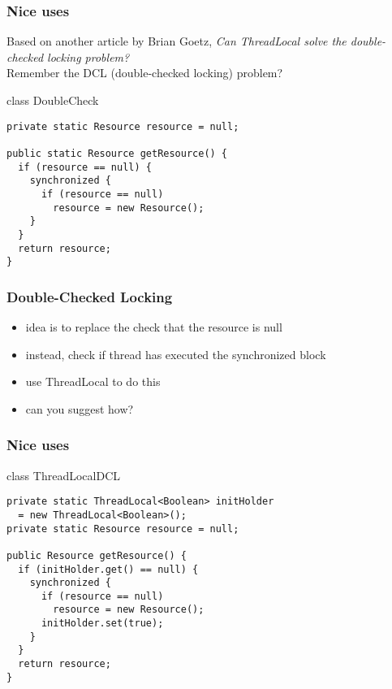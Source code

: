 \documentclass{beamer}
\begin{document}
\begin{frame}[fragile]
  \frametitle{Nice uses}

Based on another article by Brian Goetz, \textit{Can ThreadLocal solve the double-checked locking problem?}\\
\vspace*{0.5cm}
Remember the DCL (double-checked locking) problem?

\begin{block}{class DoubleCheck}
\begin{verbatim}
private static Resource resource = null;

public static Resource getResource() {
  if (resource == null) {
    synchronized {
      if (resource == null) 
        resource = new Resource();
    }
  }
  return resource;
}
\end{verbatim}
\end{block}

\end{frame}

\begin{frame}
  \frametitle{Double-Checked Locking}

\begin{itemize}
\item idea is to replace the check that the resource is null
\item instead, check if thread has executed the synchronized block
\item use ThreadLocal to do this
\item can you suggest how?
\end{itemize}

\end{frame}

\begin{frame}[fragile]
  \frametitle{Nice uses}

\begin{block}{class ThreadLocalDCL}
\begin{verbatim}
private static ThreadLocal<Boolean> initHolder
  = new ThreadLocal<Boolean>();
private static Resource resource = null;

public Resource getResource() {
  if (initHolder.get() == null) {
    synchronized {
      if (resource == null)
        resource = new Resource();
      initHolder.set(true);
    }
  }
  return resource;
}
\end{verbatim}
\end{block}

\end{frame}
\end{document}
